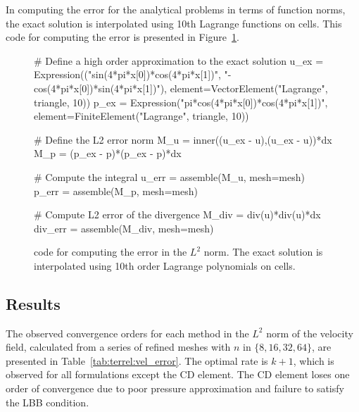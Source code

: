 In computing the error for the analytical problems in terms of function
norms, the exact solution is interpolated using 10th Lagrange
functions on cells. This code for computing the error is presented in
Figure~\ref{code:terrel:error}.

\begin{figure}
\begin{python}
# Define a high order approximation to the exact solution
u_ex = Expression(("sin(4*pi*x[0])*cos(4*pi*x[1])",
               "-cos(4*pi*x[0])*sin(4*pi*x[1])"),
               element=VectorElement("Lagrange", triangle, 10))
p_ex = Expression("pi*cos(4*pi*x[0])*cos(4*pi*x[1])",
               element=FiniteElement("Lagrange", triangle, 10))

# Define the L2 error norm
M_u = inner((u_ex - u),(u_ex - u))*dx
M_p = (p_ex - p)*(p_ex - p)*dx

# Compute the integral
u_err = assemble(M_u, mesh=mesh)
p_err = assemble(M_p, mesh=mesh)

# Compute L2 error of the divergence
M_div = div(u)*div(u)*dx
div_err = assemble(M_div, mesh=mesh)
\end{python}
\label{code:terrel:error}
\caption{\dolfin{} code for computing the error in the $L^{2}$ norm. The
exact solution is interpolated using 10th order Lagrange polynomials
on cells.}
\end{figure}
\subsection{Results}

The observed convergence orders for each method in the $L^{2}$
norm of the velocity field, calculated from a series of
refined meshes with $n$ in $\{8, 16, 32, 64\}$, are presented in
Table~\ref{tab:terrel:vel_error}. The optimal rate is $k + 1$, which is
observed for all formulations except the CD element.  The CD element
loses one order of convergence due to poor pressure approximation and
failure to satisfy the LBB condition.

